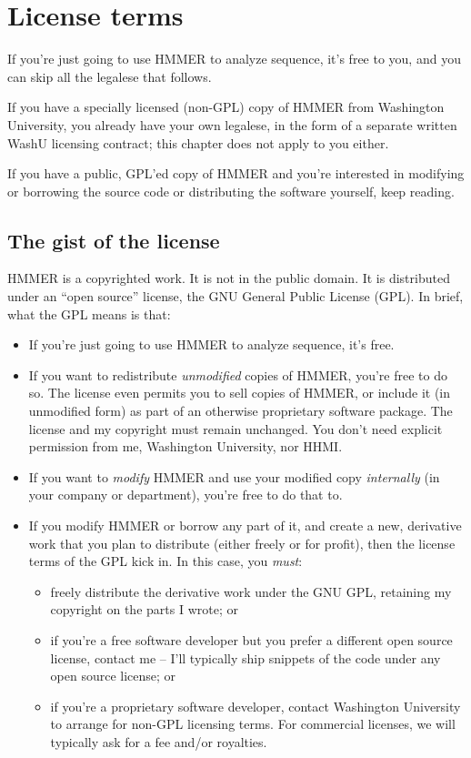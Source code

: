 \section{License terms}

If you're just going to use HMMER to analyze sequence, it's free to
you, and you can skip all the legalese that follows. 

If you have a specially licensed (non-GPL) copy of HMMER from
Washington University, you already have your own legalese, in the form
of a separate written WashU licensing contract; this chapter does not
apply to you either. 

If you have a public, GPL'ed copy of HMMER and you're interested in
modifying or borrowing the source code or distributing the software
yourself, keep reading.

\subsection{The gist of the license}

HMMER is a copyrighted work. It is not in the public domain.  It is
distributed under an ``open source'' license, the GNU General Public
License (GPL). In brief, what the GPL means is that:

\begin{itemize}
\item If you're just going to use HMMER to analyze sequence, it's free.

\item If you want to redistribute {\em unmodified} copies of HMMER,
you're free to do so.  The license even permits you to sell copies of
HMMER, or include it (in unmodified form) as part of an otherwise
proprietary software package. The license and my copyright must remain
unchanged. You don't need explicit permission from me, Washington
University, nor HHMI.

\item If you want to {\em modify} HMMER and use your modified
copy {\em internally} (in your company or department), you're free to
do that to.

\item If you modify HMMER or borrow any part of it, and create
a new, derivative work that you plan to distribute
(either freely or for profit), then the license terms of the GPL kick
in. In this case, you {\em must}:
\begin{itemize}
\item freely distribute the derivative work under the GNU GPL, retaining
my copyright on the parts I wrote; or
\item if you're a free software developer but you prefer a
different open source license, contact me -- I'll typically ship 
snippets of the code under any open source license; or
\item if you're a proprietary software developer, 
contact Washington University to arrange for non-GPL licensing
terms. For commercial licenses, we will typically ask for a fee
and/or royalties.
\end{itemize}
\end{itemize}

